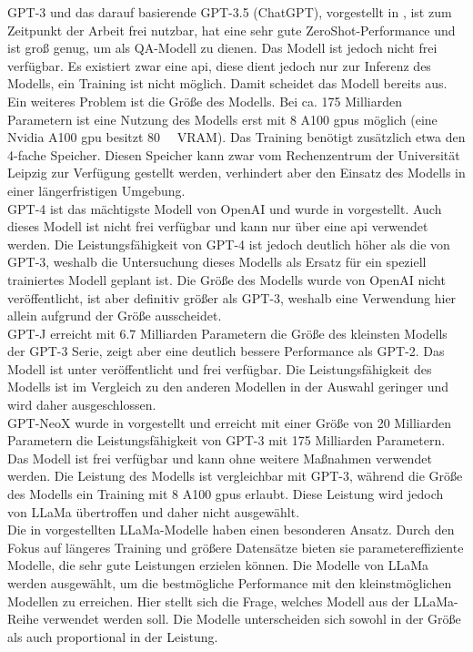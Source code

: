 GPT-3 und das darauf basierende GPT-3.5 (ChatGPT), vorgestellt in \citet{gpt3}, ist zum Zeitpunkt der Arbeit frei nutzbar, hat eine sehr gute ZeroShot-Performance und ist groß genug, um als QA-Modell zu dienen.
Das Modell ist jedoch nicht frei verfügbar.
Es existiert zwar eine \ac{api}, diese dient jedoch nur zur Inferenz des Modells, ein Training ist nicht möglich.
Damit scheidet das Modell bereits aus.
Ein weiteres Problem ist die Größe des Modells.
Bei ca. 175 Milliarden Parametern ist eine Nutzung des Modells erst mit 8 A100 \ac{gpu}s möglich (eine Nvidia A100 \ac{gpu} besitzt \SI{80}{\giga\byte} VRAM).
Das Training benötigt zusätzlich etwa den 4-fache Speicher.
Diesen Speicher kann zwar vom Rechenzentrum der Universität Leipzig zur Verfügung gestellt werden, verhindert aber den Einsatz des Modells in einer längerfristigen Umgebung.\\

GPT-4 ist das mächtigste Modell von OpenAI und wurde in \citet{gpt4} vorgestellt.
Auch dieses Modell ist nicht frei verfügbar und kann nur über eine \ac{api} verwendet werden.
Die Leistungsfähigkeit von GPT-4 ist jedoch deutlich höher als die von GPT-3, weshalb die Untersuchung dieses Modells als Ersatz für ein speziell trainiertes Modell geplant ist.
Die Größe des Modells wurde von OpenAI nicht veröffentlicht, ist aber definitiv größer als GPT-3, weshalb eine Verwendung hier allein aufgrund der Größe ausscheidet.\\

GPT-J erreicht mit \SI{6,7}{} Milliarden Parametern die Größe des kleinsten Modells der GPT-3 Serie, zeigt aber eine deutlich bessere Performance als GPT-2.
Das Modell ist unter \citet{gptj} veröffentlicht und frei verfügbar.
Die Leistungsfähigkeit des Modells ist im Vergleich zu den anderen Modellen in der Auswahl geringer und wird daher ausgeschlossen.\\

GPT-NeoX wurde in \citet{gpt_neox} vorgestellt und erreicht mit einer Größe von 20 Milliarden Parametern die Leistungsfähigkeit von GPT-3 mit 175 Milliarden Parametern.
Das Modell ist frei verfügbar und kann ohne weitere Maßnahmen verwendet werden.
Die Leistung des Modells ist vergleichbar mit GPT-3, während die Größe des Modells ein Training mit 8 A100 \ac{gpu}s erlaubt.
Diese Leistung wird jedoch von LLaMa übertroffen und daher nicht ausgewählt.\\

Die in \citet{llama} vorgestellten LLaMa-Modelle haben einen besonderen Ansatz.
Durch den Fokus auf längeres Training und größere Datensätze bieten sie parametereffiziente Modelle, die sehr gute Leistungen erzielen können.
Die Modelle von LLaMa werden ausgewählt, um die bestmögliche Performance mit den kleinstmöglichen Modellen zu erreichen.
Hier stellt sich die Frage, welches Modell aus der LLaMa-Reihe verwendet werden soll.
Die Modelle unterscheiden sich sowohl in der Größe als auch proportional in der Leistung.\\

